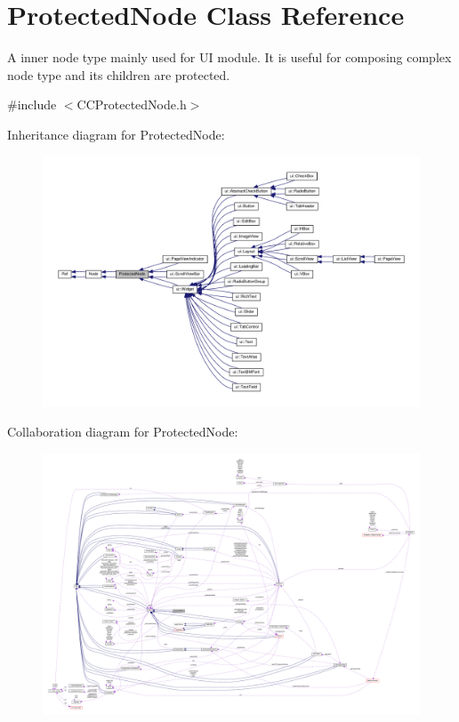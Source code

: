\hypertarget{classProtectedNode}{}\section{Protected\+Node Class Reference}
\label{classProtectedNode}


A inner node type mainly used for UI module. It is useful for composing complex node type and it\textquotesingle{}s children are protected.  




{\ttfamily \#include $<$C\+C\+Protected\+Node.\+h$>$}



Inheritance diagram for Protected\+Node\+:
\nopagebreak
\begin{figure}[H]
\begin{center}
\leavevmode
\includegraphics[width=350pt]{classProtectedNode__inherit__graph}
\end{center}
\end{figure}


Collaboration diagram for Protected\+Node\+:
\nopagebreak
\begin{figure}[H]
\begin{center}
\leavevmode
\includegraphics[width=350pt]{classProtectedNode__coll__graph}
\end{center}
\end{figure}
